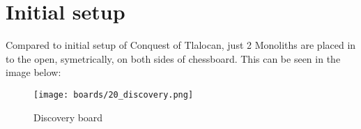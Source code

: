 \section*{Initial setup}

Compared to initial setup of Conquest of Tlalocan, just 2 Monoliths are placed in to the open,
symetrically, on both sides of chessboard. This can be seen in the image below:

\noindent
\begin{figure}[h]
\texttt{[image: boards/20\_discovery.png]}
\caption{Discovery board}
\label{fig:20_discovery}
\end{figure}

\clearpage %
